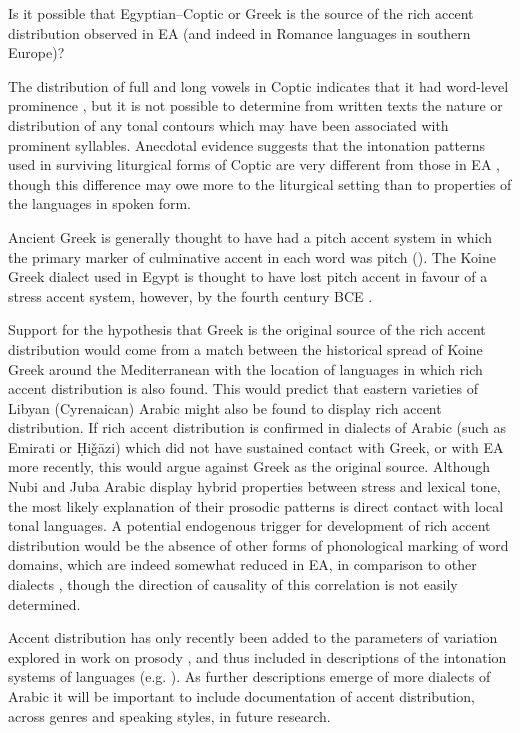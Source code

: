 \documentclass[output=paper]{langsci/langscibook}
\begin{document}
Is it possible that Egyptian--Coptic or Greek is the source of the rich accent distribution observed in EA (and indeed in Romance languages in southern Europe)? 

The distribution of full and long vowels in Coptic indicates that it had word-level prominence \citep[270]{Peust1999}, but it is not possible to determine from written texts the nature or distribution of any tonal contours which may have been associated with prominent syllables. Anecdotal evidence suggests that the intonation patterns used in surviving liturgical forms of Coptic are very different from those in EA \citep[32]{Peust1999}, though this difference may owe more to the liturgical setting than to properties of the languages in spoken form.

Ancient Greek is generally thought to have had a pitch accent system in which the primary marker of culminative accent in each word was pitch (\citealt{DevineStephens1985}). The Koine Greek dialect used in Egypt is thought to have lost pitch accent in favour of a stress accent system, however, by the fourth century BCE \citep{Benaissa2012}. 

Support for the hypothesis that Greek is the original source of the rich accent distribution would come from a match between the historical spread of Koine Greek around the Mediterranean with the location of languages in which rich accent distribution is also found. This would predict that eastern varieties of Libyan (Cyrenaican) Arabic might also be found to display rich accent distribution. If rich accent distribution is confirmed in dialects of Arabic (such as Emirati or Ḥiǧāzi) which did not have sustained contact with Greek, or with EA more recently, this would argue against Greek as the original source. Although Nubi \citep{Gussenhoven2006} and Juba Arabic \citep{Nakao2013} display hybrid properties between stress and lexical tone, the most likely explanation of their prosodic patterns is direct contact with local tonal languages. A potential endogenous trigger for development of rich accent distribution would be the absence of other forms of phonological marking of word domains, which are indeed somewhat reduced in EA, in comparison to other dialects \citep{Watson2002}, though the direction of causality of this correlation is not easily determined. 

Accent distribution has only recently been added to the parameters of variation explored in work on prosody \citep{Hellmuth2007}, and thus included in descriptions of the intonation systems of languages (e.g. \citealt{FrotaPrieto2015}). As further descriptions emerge of more dialects of Arabic it will be important to include documentation of accent distribution, across genres and speaking styles, in future research.
\largerpage
\end{document}
